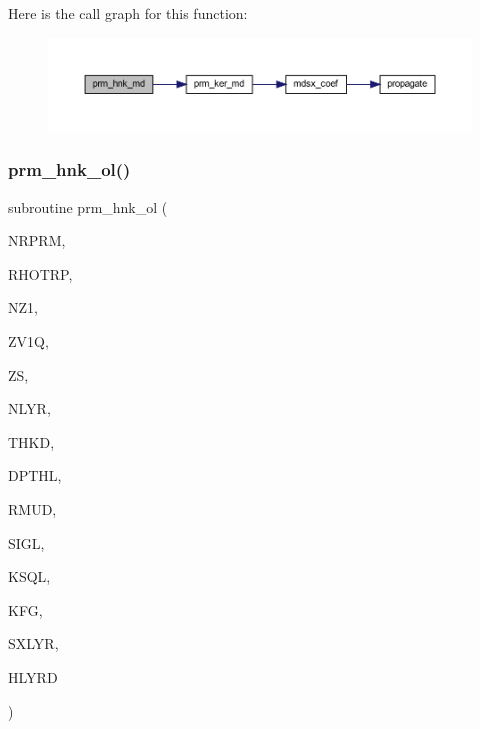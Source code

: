 Here is the call graph for this function\+:\nopagebreak
\begin{figure}[H]
\begin{center}
\leavevmode
\includegraphics[width=350pt]{Leroi__c_8f90_a9740ab7613ac873fc595cc92e6d5fbaf_cgraph}
\end{center}
\end{figure}
\mbox{\label{Leroi__c_8f90_a89b4321e05fd2190aba745c6eec86645}} 
\subsubsection{\texorpdfstring{prm\+\_\+hnk\+\_\+ol()}{prm\_hnk\_ol()}}
{\footnotesize\ttfamily subroutine prm\+\_\+hnk\+\_\+ol (\begin{DoxyParamCaption}\item[{integer}]{N\+R\+P\+RM,  }\item[{real, dimension(nrprm)}]{R\+H\+O\+T\+RP,  }\item[{integer}]{N\+Z1,  }\item[{real(kind=ql), dimension(nz1)}]{Z\+V1Q,  }\item[{real(kind=ql)}]{ZS,  }\item[{integer}]{N\+L\+YR,  }\item[{real(kind=ql), dimension (nlyr)}]{T\+H\+KD,  }\item[{real(kind=ql), dimension (nlyr)}]{D\+P\+T\+HL,  }\item[{real(kind=ql), dimension(0\+:nlyr)}]{R\+M\+UD,  }\item[{complex(kind=ql), dimension (nlyr)}]{S\+I\+GL,  }\item[{complex(kind=ql), dimension (nlyr)}]{K\+S\+QL,  }\item[{integer}]{K\+FG,  }\item[{integer}]{S\+X\+L\+YR,  }\item[{complex(kind=ql), dimension(nrprm,3,nz1)}]{H\+L\+Y\+RD }\end{DoxyParamCaption})}

